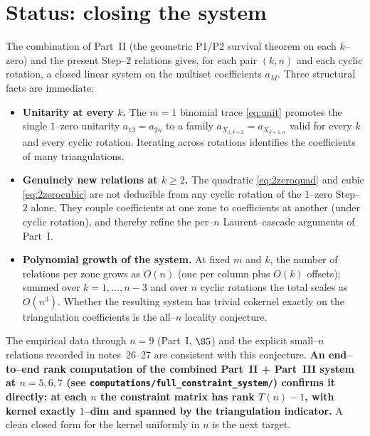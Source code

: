 \documentclass[11pt]{article}
\theoremstyle{definition}
\newcommand{\X}[1]{X_{#1}}
\begin{document}
\section{Status: closing the system}
The combination of Part~II (the geometric P1/P2 survival theorem on each $k$--zero) and the
present Step--$2$ relations gives, for each pair $(k,n)$ and each cyclic rotation, a closed
linear system on the multiset coefficients $a_M$. Three structural facts are immediate:
\begin{itemize}[topsep=2pt,itemsep=1pt]
  \item \textbf{Unitarity at every $k$.} The $m=1$ binomial trace \eqref{eq:unit} promotes the
  single $1$--zero unitarity $a_{13}=a_{2n}$ to a family $a_{\X{1,k+2}}=a_{\X{k+1,n}}$ valid for
  every $k$ and every cyclic rotation. Iterating across rotations identifies the coefficients of
  many triangulations.
  \item \textbf{Genuinely new relations at $k\ge2$.} The quadratic \eqref{eq:2zeroquad} and cubic
  \eqref{eq:2zerocubic} are not deducible from any cyclic rotation of the $1$--zero Step--$2$
  alone. They couple coefficients at one zone to coefficients at another (under cyclic rotation), and
  thereby refine the per--$n$ Laurent--cascade arguments of Part~I.
  \item \textbf{Polynomial growth of the system.} At fixed $m$ and $k$, the number of relations per
  zone grows as $O(n)$ (one per column plus $O(k)$ offsets); summed over $k=1,\dots,n-3$ and over
  $n$ cyclic rotations the total scales as $O(n^3)$. Whether the resulting system has trivial
  cokernel exactly on the triangulation coefficients is the all--$n$ locality conjecture.
\end{itemize}
The empirical data through $n=9$ (Part~I, $\S5$) and the explicit small--$n$ relations recorded
in notes~26--27 are consistent with this conjecture. \textbf{An end--to--end rank computation
of the combined Part~II + Part~III system at $n=5,6,7$
(see \texttt{computations/full\_constraint\_system/}) confirms it directly: at each $n$ the
constraint matrix has rank $T(n)-1$, with kernel exactly $1$--dim and spanned by the
triangulation indicator.} A clean closed form for the kernel uniformly in $n$ is the next
target.
\end{document}
